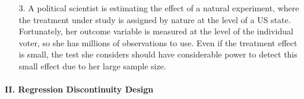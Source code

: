 \documentclass{article}
\begin{document}
\begin{itemize}
\item[3.]A political scientist is estimating the effect of a natural
  experiment, where the treatment under study is assigned by nature at
  the level of a US state. Fortunately, her outcome variable is
  measured at the level of the individual voter, so she has millions
  of observations to use. Even if the treatment effect is small, the
  test she considers should have considerable power to detect this
  small effect due to her large sample size.

\end{itemize}


\paragraph{\Large II. Regression Discontinuity Design \\ \\}
\vspace{1em} 
\end{document}
